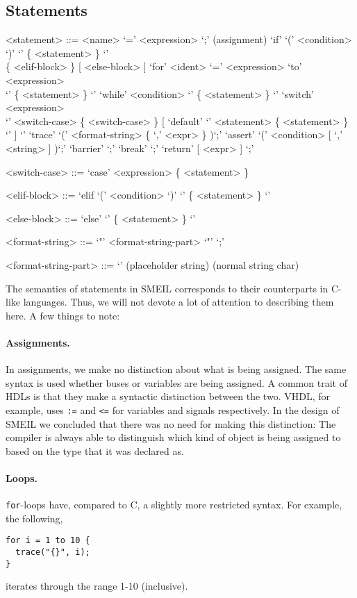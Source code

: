 \subsection{Statements}
\begin{grammar}
  <statement> ::= <name> `=' <expression> `;' (assignment)
  \alt `if' `(' <condition> `)' `{' \{ <statement> \} `}' \\ \{ <elif-block>
    \} [ <else-block> ]
  \alt `for' <ident> `=' <expression> `to' <expression> \\ `{' \{ <statement> \} `}'
  \alt `while' <condition> `{' \{ <statement> \} `}'
  \alt `switch' <expression> \\ `{' <switch-case> \{ <switch-case> \}
  [ `default' `{' <statement> \{ <statement> \} `}' ] `}'
  \alt `trace' `(' <format-string> \{ `,' <expr> \} )`;'
  \alt `assert' `(' <condition> [ `,' <string> ] )`;'
  \alt `barrier' `;'
  \alt `break' `;'
  \alt `return' [ <expr> ] `;'

  <switch-case> ::= `case' <expression> \{ <statement> \}

  <elif-block> ::= `elif `(' <condition> `)' `{' \{ <statement> \} `}'

  <else-block> ::= `else' `{' \{ <statement> \} `}'

  <format-string> ::= `"' { <format-string-part> } `"' `;'
  
  <format-string-part> ::= `{}' (placeholder string)
   (normal string char)
\end{grammar}

The semantics of statements in SMEIL corresponds to their counterparts in C-like
languages. Thus, we will not devote a lot of attention to describing them
here. A few things to note:

\paragraph{Assignments.} In assignments, we make no distinction about what is
being assigned. The same syntax is used whether buses or variables are being
assigned. A common trait of HDLs is that they make a syntactic distinction
between the two. VHDL, for example, uses \texttt{:=} and \texttt{<=} for
variables and signals respectively. In the design of SMEIL we concluded that
there was no need for making this distinction: The compiler is always able to
distinguish which kind of object is being assigned to based on the type that it
was declared as.

\paragraph{Loops.} \texttt{for}-loops have, compared to C, a slightly more
restricted syntax. For example, the following,
\begin{lstlisting}[language=smeil]
for i = 1 to 10 {
  trace("{}", i);
}
\end{lstlisting}
iterates through the range 1-10 (inclusive).

